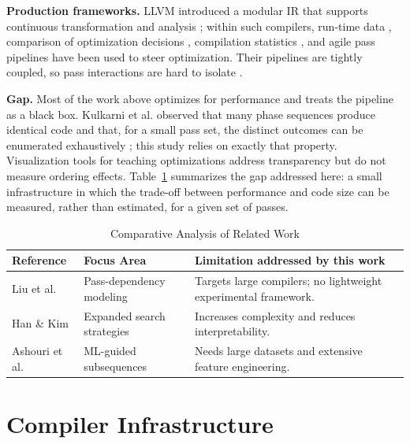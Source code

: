 \documentclass[conference]{IEEEtran}
\begin{document}
\textbf{Production frameworks.} LLVM introduced a modular IR that supports continuous transformation and analysis \cite{ref16}; within such compilers, run-time data \cite{ref23}, comparison of optimization decisions \cite{ref24}, compilation statistics \cite{ref7}, and agile pass pipelines \cite{ref27} have been used to steer optimization. Their pipelines are tightly coupled, so pass interactions are hard to isolate \cite{ref16}.

\textbf{Gap.} Most of the work above optimizes for performance and treats the pipeline as a black box. Kulkarni et al. observed that many phase sequences produce identical code and that, for a small pass set, the distinct outcomes can be enumerated exhaustively \cite{ref19}; this study relies on exactly that property. Visualization tools for teaching optimizations \cite{ref30} address transparency but do not measure ordering effects. Table~\ref{tab:lit_review} summarizes the gap addressed here: a small infrastructure in which the trade-off between performance and code size can be measured, rather than estimated, for a given set of passes.

\begin{table}[htbp]
\caption{Comparative Analysis of Related Work}
\label{tab:lit_review}
\centering
\renewcommand{\arraystretch}{1.0}
{\footnotesize
\begin{tabularx}{\columnwidth}{@{}p{} p{} X@{}}
\toprule
\textbf{Reference} & \textbf{Focus Area} & \textbf{Limitation addressed by this work} \\
\midrule
Liu et al. \cite{ref1} & Pass-dependency modeling & Targets large compilers; no lightweight experimental framework. \\
Han \& Kim \cite{ref2} & Expanded search strategies & Increases complexity and reduces interpretability. \\
Ashouri et al. \cite{ref15} & ML-guided subsequences & Needs large datasets and extensive feature engineering. \\
\bottomrule
\end{tabularx}
}
\end{table}

\section{Compiler Infrastructure}
\end{document}
